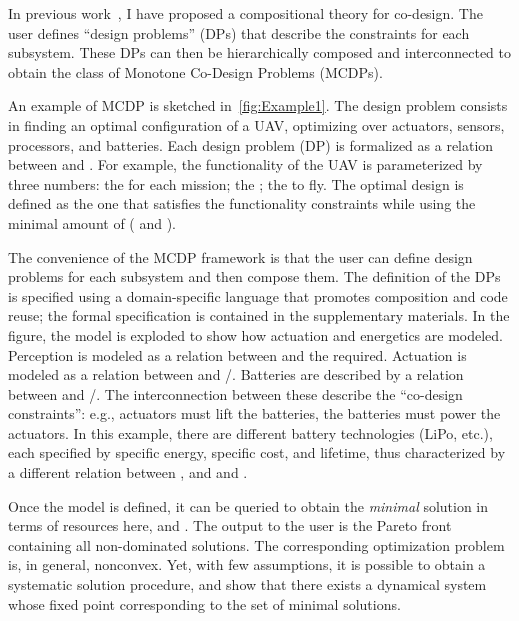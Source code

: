 In previous work~\cite{censi15monotone,censi15same,censi16codesign_sep16},
I have proposed a compositional theory for co-design. The user defines
``design problems'' (DPs) that describe the constraints for each
subsystem. These DPs can then be hierarchically composed and interconnected
to obtain the class of Monotone Co-Design Problems (MCDPs).

An example of MCDP is sketched in~\cref{fig:Example1}. The
design problem consists in finding an optimal configuration of a UAV,
optimizing over actuators, sensors, processors, and batteries. Each
design problem (DP) is formalized as a relation between 
and . For example, the functionality of the UAV is parameterized
by three numbers: the  for each mission; the
; the  to fly. The
optimal design is defined as the one that satisfies the functionality
constraints while using the minimal amount of  (
and ).

The convenience of the MCDP framework is that the user can define
design problems for each subsystem and then compose them. The definition
of the DPs is specified using a domain-specific language that promotes
composition and code reuse; the formal specification is contained
in the supplementary materials. In the figure, the model is exploded
to show how actuation and energetics are modeled. Perception is modeled
as a relation between  and the 
required. Actuation is modeled as a relation between  and
/. Batteries are described by a relation between
 and /. The interconnection between
these describe the ``co-design constraints'': e.g., actuators must
lift the batteries, the batteries must power the actuators. In this
example, there are different battery technologies (LiPo, etc.), each
specified by specific energy, specific cost, and lifetime, thus characterized
by a different relation between , 
and  and .

Once the model is defined, it can be queried to obtain the \emph{minimal}
solution in terms of resources \textemdash{} here, 
and . The output to the user is the Pareto front containing
all non-dominated solutions. The corresponding optimization problem
is, in general, nonconvex. Yet, with few assumptions, it is possible
to obtain a systematic solution procedure, and show that there exists
a dynamical system whose fixed point corresponding to the set of minimal
solutions.


